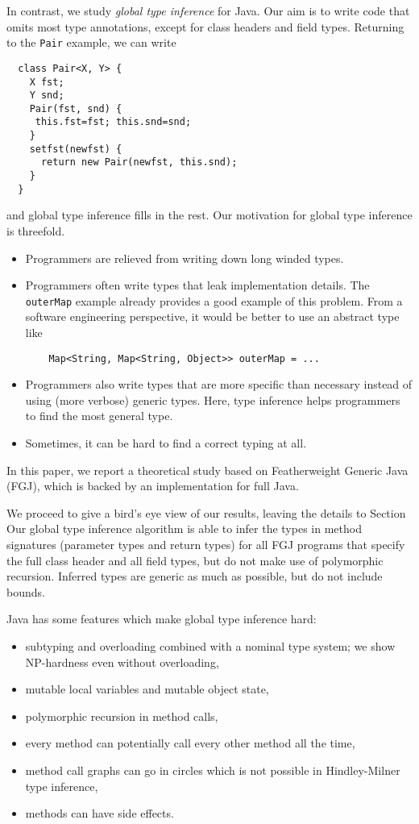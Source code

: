In contrast, we study \emph{global type inference} for Java. Our aim
is to write code that omits most type annotations, except for class
headers and field types. Returning to the \lstinline{Pair} example, we
can write
\begin{lstlisting}
  class Pair<X, Y> {
    X fst;
    Y snd;
    Pair(fst, snd) {
     this.fst=fst; this.snd=snd;
    }
    setfst(newfst) {
      return new Pair(newfst, this.snd);
    }
  }  
\end{lstlisting}
and global type inference fills in the rest. Our motivation for global
type inference is threefold.
\begin{itemize}
\item Programmers are relieved from writing down long winded types. 
\item Programmers often write types that leak implementation details. The
  \lstinline{outerMap} example already provides a good example of this
  problem. From a software engineering
  perspective, it would be better to use an abstract type like
  \begin{lstlisting}
    Map<String, Map<String, Object>> outerMap = ...
  \end{lstlisting}
\item Programmers also write types that are more specific than
  necessary instead of using (more verbose) generic types. Here, type
  inference helps programmers to find the most general type.
\item Sometimes, it can be hard to find a correct typing at all.
\end{itemize}

In this paper, we report a theoretical study based on Featherweight
Generic Java \cite{DBLP:journals/toplas/IgarashiPW01} (FGJ), which is backed
by an implementation for full Java.

We proceed to give a bird's eye view of our results, leaving the
details to Section
Our global type inference algorithm is able to infer the types in
method signatures (parameter types and return types) for all
FGJ programs that specify the full class header and all field types,
but do not make use of polymorphic recursion.
Inferred types are generic as much as possible, but do not include bounds.


Java has some features which make global type inference hard:
\begin{itemize}
\item subtyping and overloading combined with a nominal type system;
  we show NP-hardness even without overloading,
\item mutable local variables and mutable object state,
\item polymorphic recursion in method calls,
\item every method can potentially call every other method all the
  time,
\item method call graphs can go in circles which is not possible in
  Hindley-Milner type inference,
\item methods can have side effects.
\end{itemize}

